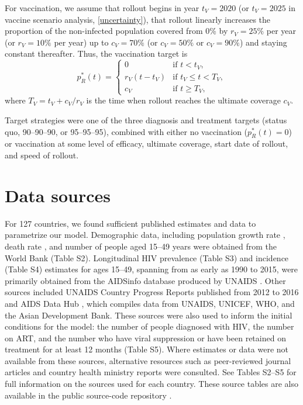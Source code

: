 \documentclass{article}
\begin{document}
For vaccination, we assume that rollout begins in year $t_V = 2020$
(or $t_V = 2025$ in vaccine scenario analysis, \autoref{uncertainty}),
that rollout linearly increases the proportion of the non-infected
population covered from 0\% by $r_V = 25\%$ per year (or $r_V = 10\%$
per year) up to $c_V = 70\%$ (or $c_V = 50\%$ or $c_V = 90\%$) and
staying constant thereafter.  Thus, the vaccination target is
\begin{equation}
  \label{vaccination_target}
  p_R^*(t) =
  \begin{cases}
    0 & \text{if $t < t_V$},
    \\
    r_V (t - t_V) & \text{if $t_V \leq t < T_V$},
    \\
    c_V & \text{if $t \geq T_V$},
  \end{cases}
\end{equation}
where $T_V = t_V + c_V / r_V$ is the time when rollout reaches
the ultimate coverage $c_V$.

Target strategies were one of the three diagnosis and treatment
targets (status quo, 90--90--90, or 95--95--95), combined with either
no vaccination ($p_R^*(t) = 0$) or vaccination at some level of
efficacy, ultimate coverage, start date of rollout, and speed of
rollout.


\section{Data sources}
\label{data_sources}

For 127 countries, we found sufficient published estimates and data to
parametrize our model.  Demographic data, including population growth
rate \cite{WorldBankpg}, death rate
\cite{World_Development_Indicators2013-ee}, and number of people aged
15--49 years \cite{The_World_Bank2016-fd} were obtained from the World
Bank (Table S2). Longitudinal HIV prevalence (Table S3) and incidence
(Table S4) estimates for ages 15--49, spanning from as early as 1990
to 2015, were primarily obtained from the AIDSinfo database produced
by UNAIDS \cite{Unaids2016-an}. Other sources included UNAIDS Country
Progress Reports \cite{Unaids2016-am} published from 2012 to 2016 and
AIDS Data Hub \cite{AIDSdatahub-fg}, which compiles data from UNAIDS,
UNICEF, WHO, and the Asian Development Bank. These sources were also
used to inform the initial conditions for the model: the number of
people diagnosed with HIV, the number on ART, and the number who have
viral suppression or have been retained on treatment for at least 12
months (Table S5). Where estimates or data were not available from
these sources, alternative resources such as peer-reviewed journal
articles and country health ministry reports were consulted.  See
Tables S2--S5 for full information on the sources used for each
country.  These source tables are also available in the public
source-code repository \cite{medlock2016-git}.
\end{document}

